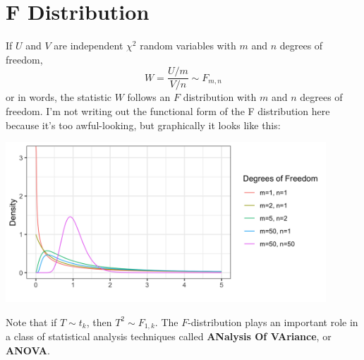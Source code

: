 \section{F Distribution}

If $U$ and $V$ are independent $\chi^2$ random variables with $m$ and $n$ degrees of freedom,
$$ W = \frac{U/m}{V/n} \sim F_{m, n} $$
or in words, the statistic $W$ follows an $F$ distribution with $m$ and $n$ degrees of freedom. I'm not writing out the functional form of the F distribution here because it's too awful-looking, but graphically it looks like this:
\begin{center}
\includegraphics[width=0.9\textwidth]{img/hyp-example-f-distribution.png}
\end{center}

Note that if $T \sim t_k$, then $T^2 \sim F_{1,k}$. The $F$-distribution plays an important role in a class of statistical analysis techniques called \textbf{ANalysis Of VAriance}, or \textbf{ANOVA}.

\vspace{2mm}

